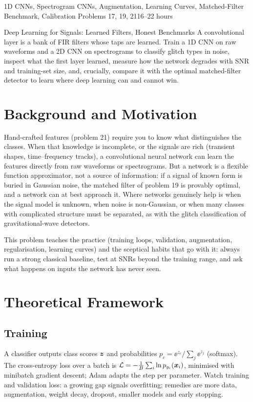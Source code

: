\documentclass[11pt,a4paper]{article}
\begin{document}
%
{1D CNNs, Spectrogram CNNs, Augmentation, Learning Curves, Matched-Filter Benchmark, Calibration}%
{Problems 17, 19, 21}{16--22 hours}

\begin{summarybox}{Deep Learning for Signals: Learned Filters, Honest Benchmarks}
A convolutional layer is a bank of FIR filters whose taps are learned. Train a 1D CNN on raw waveforms and a 2D CNN on spectrograms to classify glitch types in noise, inspect what the first layer learned, measure how the network degrades with SNR and training-set size, and, crucially, compare it with the optimal matched-filter detector to learn where deep learning can and cannot win.
\end{summarybox}


\section*{Background and Motivation}
Hand-crafted features (problem 21) require you to know what distinguishes the classes. When that knowledge is incomplete, or the signals are rich (transient shapes, time--frequency tracks), a convolutional neural network can learn the features directly from raw waveforms or spectrograms. But a network is a flexible function approximator, not a source of information: if a signal of known form is buried in Gaussian noise, the matched filter of problem 19 is provably optimal, and a network can at best approach it. Where networks genuinely help is when the signal model is unknown, when noise is non-Gaussian, or when many classes with complicated structure must be separated, as with the glitch classification of gravitational-wave detectors.

This problem teaches the practice (training loops, validation, augmentation, regularisation, learning curves) and the sceptical habits that go with it: always run a strong classical baseline, test at SNRs beyond the training range, and ask what happens on inputs the network has never seen.

\section*{Theoretical Framework}
\subsection{Training}
A classifier outputs class scores $\bm{z}$ and probabilities $p_c=\ee^{z_c}/\sum_j\ee^{z_j}$ (softmax). The cross-entropy loss over a batch is $\mathcal L=-\frac1B\sum_i\ln p_{y_i}(\bm{x}_i)$, minimised with minibatch gradient descent; Adam adapts the step per parameter. Watch training and validation loss: a growing gap signals overfitting; remedies are more data, augmentation, weight decay, dropout, smaller models and early stopping.
\end{document}
